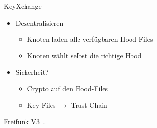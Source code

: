 \begin{frame}{KeyXchange}
    \begin{itemize}
        \item Dezentralisieren
        \begin{itemize}
            \item Knoten laden alle verfügbaren Hood-Files
            \item Knoten wählt selbst die richtige Hood
        \end{itemize}
        \item Sicherheit?
        \begin{itemize}
            \item Crypto auf den Hood-Files
            \item Key-Files $\rightarrow$ Trust-Chain
        \end{itemize}
    \end{itemize}
\end{frame}


\begin{frame}{Freifunk V3}
    ..
\end{frame}

